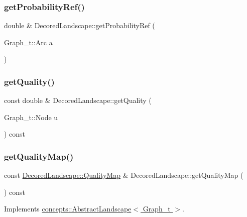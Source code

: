 \subsubsection{\texorpdfstring{get\+Probability\+Ref()}{getProbabilityRef()}}
{\footnotesize\ttfamily double \& Decored\+Landscape\+::get\+Probability\+Ref (\begin{DoxyParamCaption}\item[{Graph\+\_\+t\+::\+Arc}]{a }\end{DoxyParamCaption})}

\mbox{\label{class_decored_landscape_a5bfb2c9f5ef7e7c760d8804d0ffd9d9b}} 
\subsubsection{\texorpdfstring{get\+Quality()}{getQuality()}}
{\footnotesize\ttfamily const double \& Decored\+Landscape\+::get\+Quality (\begin{DoxyParamCaption}\item[{Graph\+\_\+t\+::\+Node}]{u }\end{DoxyParamCaption}) const}

\mbox{\label{class_decored_landscape_a0493646916af886d3d0404760c3d5e4e}} 
\subsubsection{\texorpdfstring{get\+Quality\+Map()}{getQualityMap()}}
{\footnotesize\ttfamily const \hyperlink{classconcepts_1_1_abstract_landscape_aab540b896ac9b7a7a5783f2a78f304ad}{Decored\+Landscape\+::\+Quality\+Map} \& Decored\+Landscape\+::get\+Quality\+Map (\begin{DoxyParamCaption}{ }\end{DoxyParamCaption}) const\hspace{0.3cm}{\ttfamily [virtual]}}



Implements \hyperlink{classconcepts_1_1_abstract_landscape_ab0ff4aa5ac8d95d9207e32582e3e95f2}{concepts\+::\+Abstract\+Landscape$<$ Graph\+\_\+t $>$}.

